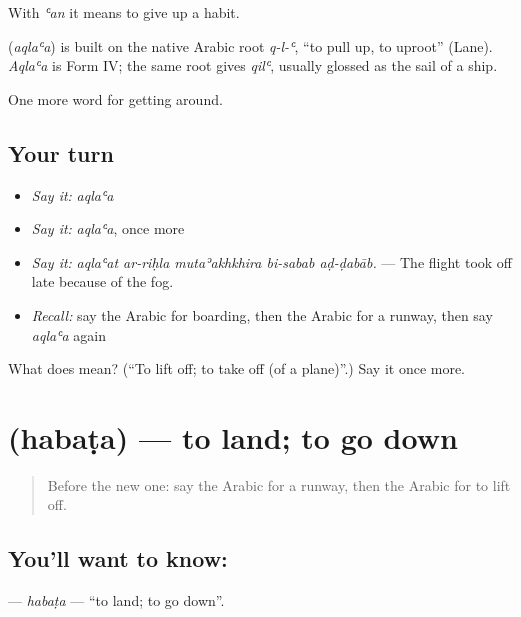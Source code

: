 With \emph{ʿan} it means to give up a habit.

\begin{cousinweb}
\textbf{} (\emph{aqlaʿa}) is built on the native Arabic root \emph{q-l-ʿ}, \textquotedblleft{}to pull up, to uproot\textquotedblright{} (Lane). \emph{Aqlaʿa} is Form IV; the same root gives \emph{qilʿ}, usually glossed as the sail of a ship.
\end{cousinweb}

\begin{grammarlens}[title={What you've built}]
One more word for getting around.
\end{grammarlens}

\subsection*{Your turn}
\begin{itemize}
\raggedright
  \item \emph{Say it:} \emph{aqlaʿa}
  \item \emph{Say it:} \emph{aqlaʿa}, once more
  \item \emph{Say it:} \emph{aqlaʿat ar-riḥla mutaʾakhkhira bi-sabab aḍ-ḍabāb.} — The flight took off late because of the fog.
  \item \emph{Recall:} say the Arabic for boarding, then the Arabic for a runway, then say \emph{aqlaʿa} again
\end{itemize}

\begin{tcolorbox}[breakable,colback=teal!4,colframe=teal!35!black,title={Before you move on}]
What does  mean? (\textquotedblleft{}To lift off; to take off (of a plane)\textquotedblright{}.) Say it once more.
\end{tcolorbox}
\section[\texorpdfstring{\ar{هبط} (habaṭa)}{هبط (habaṭa)}]{ (habaṭa) — to land; to go down}

\label{lesson:AR-C424-habata}



\begin{quote}
Before the new one: say the Arabic for a runway, then the Arabic for to lift off.
\end{quote}

\subsection*{You'll want to know: }
\textbf{} — \emph{habaṭa} — \textquotedblleft{}to land; to go down\textquotedblright{}.

